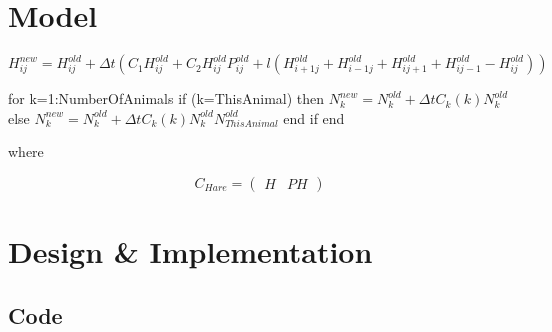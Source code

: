 \documentclass[11pt]{report}
\begin{document}
\chapter{Model} %

$H_{ij}^{new}=H_{ij}^{old} + {\Delta}t(C_{1}H_{ij}^{old}+C_{2}H_{ij}^{old}P_{ij}^{old} + l(H_{i+1j}^{old} + H_{i-1j}^{old} + H_{ij+1}^{old} + H_{ij-1}^{old}-H_{ij}^{old}))$


\vspace{30 mm}

\noindent for k=1:NumberOfAnimals\newline{}
if (k=ThisAnimal) then\newline{}
$N_{k}^{new}=N_{k}^{old} + {\Delta}tC_{k}(k)N_{k}^{old}$\newline{}
else\newline{}
$N_{k}^{new}=N_{k}^{old} + {\Delta}tC_{k}(k)N_{k}^{old}N_{ThisAnimal}^{old}$\newline{}
end if\newline{}
end

where

\[ C_{Hare} = \left( \begin{array}{cc}
H & PH \end{array} \right)\]    


\chapter{Design \& Implementation}
   \section{Code}
\end{document}
